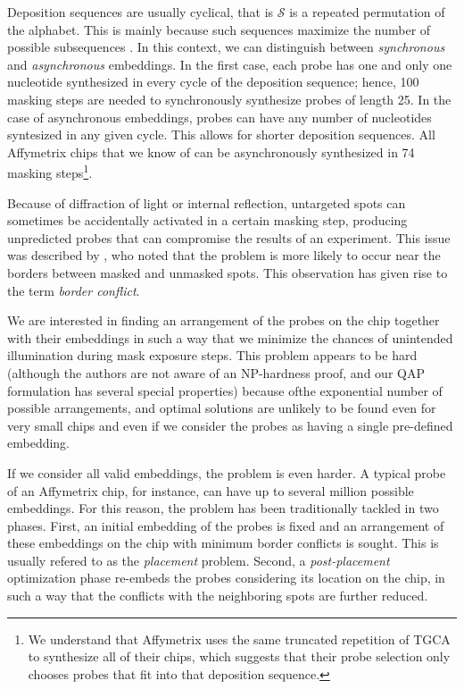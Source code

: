 \documentclass{bioinfo}
\begin{document}
Deposition sequences are usually cyclical, that is $\mathcal{S}$ is a repeated permutation of the alphabet. This is mainly because such sequences maximize the number of possible subsequences \citep{CHASE76}. In this context, we can distinguish between \emph{synchronous} and \emph{asynchronous} embeddings. In the first case, each probe has one and only one nucleotide synthesized in every cycle of the deposition sequence; hence, 100 masking steps are needed to synchronously synthesize probes of length 25. In the case of asynchronous embeddings, probes can have any number of nucleotides syntesized in any given cycle. This allows for shorter deposition sequences. All Affymetrix chips that we know of can be asynchronously synthesized in 74 masking steps\footnote{We understand that Affymetrix uses the same truncated repetition of TGCA to synthesize all of their chips, which suggests that their probe selection only chooses probes that fit into that deposition sequence.}.

Because of diffraction of light or internal reflection, untargeted spots can sometimes be accidentally activated in a certain masking step, producing unpredicted probes that can compromise the results of an experiment. This issue was described by \citet{FODOR91}, who noted that the problem is more likely to occur near the borders between masked and unmasked spots. This observation has given rise to the term \emph{border conflict}.

We are interested in finding an arrangement of the probes on the chip together with their embeddings in such a way that we minimize the chances of unintended illumination during mask exposure steps. This problem appears to be hard (although the authors are not aware of an NP-hardness proof, and our QAP formulation has several special properties) because ofthe exponential number of possible arrangements, and optimal solutions are unlikely to be found even for very small chips and even if we consider the probes as having a single pre-defined embedding.

If we consider all valid embeddings, the problem is even harder. A typical probe of an Affymetrix chip, for instance, can have up to several million possible embeddings. For this reason, the problem has been traditionally tackled in two phases. First, an initial embedding of the probes is fixed and an arrangement of these embeddings on the chip with minimum border conflicts is sought. This is usually refered to as the \emph{placement} problem. Second, a \emph{post-placement} optimization phase re-embeds the probes considering its location on the chip, in such a way that the conflicts with the neighboring spots are further reduced.
\end{document}
